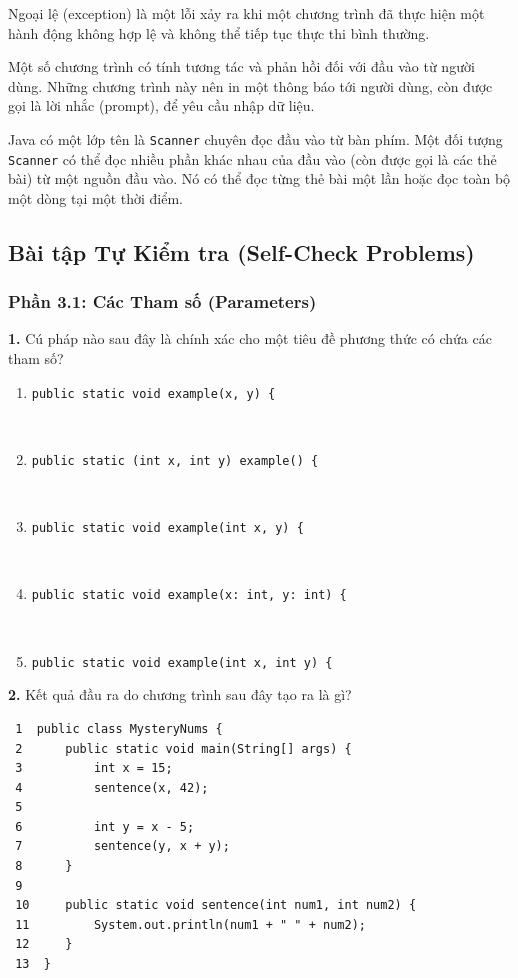 Ngoại lệ (exception) là một lỗi xảy ra khi một chương trình đã thực hiện
một hành động không hợp lệ và không thể tiếp tục thực thi bình thường.

Một số chương trình có tính tương tác và phản hồi đối với đầu vào từ
người dùng. Những chương trình này nên in một thông báo tới người dùng,
còn được gọi là lời nhắc (prompt), để yêu cầu nhập dữ liệu.

Java có một lớp tên là \texttt{Scanner} chuyên đọc đầu vào từ bàn phím.
Một đối tượng \texttt{Scanner} có thể đọc nhiều phần khác nhau của đầu
vào (còn được gọi là các thẻ bài) từ một nguồn đầu vào. Nó có thể đọc
từng thẻ bài một lần hoặc đọc toàn bộ một dòng tại một thời điểm.

\subsection{Bài tập Tự Kiểm tra (Self-Check
Problems)}\label{buxe0i-tux1eadp-tux1ef1-kiux1ec3m-tra-self-check-problems}

\subsubsection{Phần 3.1: Các Tham số
(Parameters)}\label{phux1ea7n-3.1-cuxe1c-tham-sux1ed1-parameters}

\textbf{1.} Cú pháp nào sau đây là chính xác cho một tiêu đề phương thức
có chứa các tham số?

\begin{enumerate}
\def\labelenumi{\alph{enumi}.}
\tightlist
\item
  \texttt{public\ static\ void\ example(x,\ y)\ \{}\strut \\
\item
  \texttt{public\ static\ (int\ x,\ int\ y)\ example()\ \{}\strut \\
\item
  \texttt{public\ static\ void\ example(int\ x,\ y)\ \{}\strut \\
\item
  \texttt{public\ static\ void\ example(x:\ int,\ y:\ int)\ \{}\strut \\
\item
  \texttt{public\ static\ void\ example(int\ x,\ int\ y)\ \{}
\end{enumerate}

\textbf{2.} Kết quả đầu ra do chương trình sau đây tạo ra là gì?

\begin{verbatim}
 1  public class MysteryNums {
 2      public static void main(String[] args) {
 3          int x = 15;
 4          sentence(x, 42);
 5
 6          int y = x - 5;
 7          sentence(y, x + y);
 8      }
 9
 10     public static void sentence(int num1, int num2) {
 11         System.out.println(num1 + " " + num2);
 12     }
 13  }
\end{verbatim}

